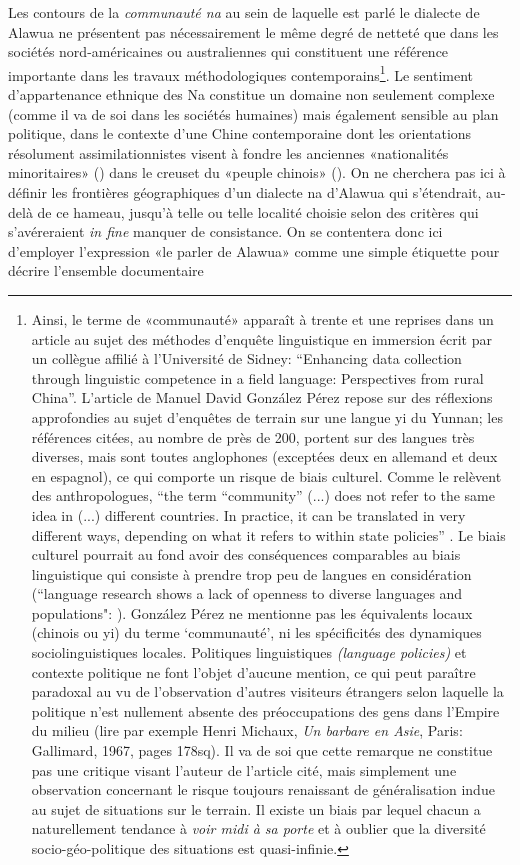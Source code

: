 Les contours de la \emph{communauté na} au sein de laquelle est parlé le dialecte de Alawua ne présentent pas nécessairement le même degré de netteté que dans les sociétés nord-américaines ou australiennes qui constituent une référence importante dans les travaux méthodologiques contemporains\footnote{Ainsi, le terme de «communauté» apparaît à trente et une reprises dans un article au sujet des méthodes d'enquête linguistique en immersion écrit par un collègue affilié à l'Université de Sidney: ``Enhancing data collection through linguistic competence in a field language: Perspectives from rural China''.  L'article de Manuel David González Pérez repose sur des réflexions approfondies au sujet d'enquêtes de terrain sur une langue yi du Yunnan; les références citées, au nombre de près de 200, portent sur des langues très diverses, mais sont toutes anglophones (exceptées deux en allemand et deux en espagnol), ce qui comporte un risque de biais culturel. Comme le relèvent des anthropologues, ``the term “community” (...) does not refer to the same idea in (...) different countries. In practice, it can be translated in very different ways, depending on what it refers to within state policies'' \parencite{dallesmarechal_logics_2023}. Le biais culturel pourrait au fond avoir des conséquences comparables au biais linguistique qui consiste à prendre trop peu de langues en considération (``language research shows a lack of openness to diverse languages and populations": \cite[23]{bochynska_reproducible_2023}). González Pérez ne mentionne pas les équivalents locaux (chinois ou yi) du terme `communauté', ni les spécificités des dynamiques sociolinguistiques locales. Politiques linguistiques \emph{(language policies)} et contexte politique ne font l'objet d'aucune mention, ce qui peut paraître paradoxal au vu de l'observation d'autres visiteurs étrangers selon laquelle la politique n'est nullement absente des préoccupations des gens dans l'Empire du milieu (lire par exemple Henri Michaux, \emph{Un barbare en Asie}, Paris: Gallimard, 1967, pages 178sq). Il va de soi que cette remarque ne constitue pas une critique visant l'auteur de l'article cité, mais simplement une observation concernant le risque toujours renaissant de généralisation indue au sujet de situations sur le terrain. Il existe un biais par lequel chacun a naturellement tendance à \emph{voir midi à sa porte} et à oublier que la diversité socio-géo-politique des situations est quasi-infinie.}. Le sentiment d'appartenance ethnique des Na constitue un domaine non seulement complexe (comme il va de soi dans les sociétés humaines) mais également sensible au plan politique, dans le contexte d'une Chine contemporaine dont les orientations résolument assimilationnistes visent à fondre les anciennes «nationalités minoritaires» () dans le creuset du «peuple chinois» (). On ne cherchera pas ici à définir les frontières géographiques d'un dialecte na d'Alawua qui s'étendrait, au-delà de ce hameau, jusqu'à telle ou telle localité choisie selon des critères qui s'avéreraient \emph{in fine} manquer de consistance. On se contentera donc ici d'employer l'expression «le parler de Alawua» comme une simple étiquette pour décrire l'ensemble documentaire 